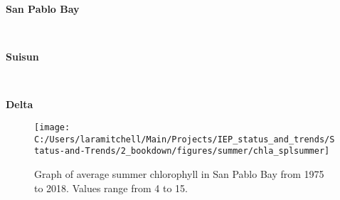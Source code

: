 \documentclass[
]{book}
\begin{document}
\begin{panel-grid}

\begin{columns-nocenter}

\begin{column800}

\textbf{San Pablo Bay}

\end{column800}

\begin{column40}

~

\end{column40}

\begin{column800}

\textbf{Suisun}

\end{column800}

\begin{column40}

~

\end{column40}

\begin{column800}

\textbf{Delta}

\end{column800}

\end{columns-nocenter}

\begin{columns-nocenter}

\begin{column800}

\begin{expand}

\begin{figure}
\texttt{[image: C:/Users/laramitchell/Main/Projects/IEP\_status\_and\_trends/Status-and-Trends/2\_bookdown/figures/summer/chla\_splsummer]} \caption{Graph of average summer chlorophyll in San Pablo Bay from 1975 to 2018. Values range from 4 to 15.}\label{fig:unnamed-chunk-63}
\end{figure}

\end{expand}

\end{column800}

\begin{column40}

~


\end{column40}
\end{columns-nocenter}
\end{panel-grid}
\end{document}
